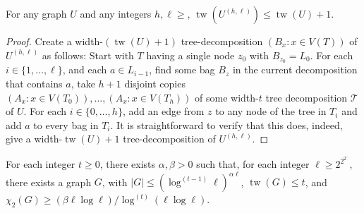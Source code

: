 \documentclass[kpfonts]{patmorin}
\DeclareMathOperator{\tw}{tw}
\newcommand{\uqs}{\chi_2}
\theoremstyle{named}
\begin{document}
\begin{lem}\label{boost-treewidth}
    For any graph $U$ and any integers $h,\ell\ge$, $\tw(U^{(h,\ell)})\le \tw(U)+1$.
\end{lem}

\begin{proof}
  Create a width-$(\tw(U)+1)$ tree-decomposition $(B_x:x\in V(T))$ of $U^{(h,\ell)}$ as follows: Start with $T$ having a single node $z_0$ with $B_{z_0}=L_0$.  For each $i\in\{1,\ldots,\ell\}$, and each $a\in L_{i-1}$, find some bag $B_z$ in the current decomposition that contains $a$, take $h+1$ disjoint copies $(A_x:x\in V(T_0)),\ldots,(A_x:x\in V(T_h))$ of some width-$t$ tree decomposition $\mathcal{T}$ of $U$.  For each $i\in\{0,\ldots,h\}$, add an edge from $z$ to any node of the tree in $T_i$ and add $a$ to every bag in $T_i$.  It is straightforward to verify that this does, indeed, give a width-$\tw(U)+1$ tree-decomposition of $U^{(h,\ell)}$.
\end{proof}


\begin{thm}\label{treewidth-lower-bound}
    For each integer $t\ge 0$, there exists $\alpha,\beta>0$
    such that, for each integer $\ell\ge 2^{2^{2^{\ddots}}}$, there exists a graph $G$, with $|G|\le (\log^{(t-1)}\ell)^{\alpha\ell}$, $\tw(G)\le t$, and $\uqs(G)\ge (\beta\ell\log\ell)/\log^{(t)}(\ell\log\ell)$.
\end{thm}
\end{document}
